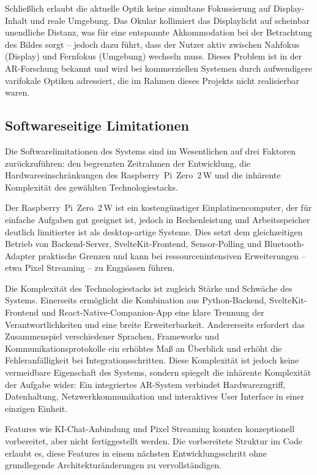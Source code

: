 Schließlich erlaubt die aktuelle Optik keine simultane Fokussierung auf
Display-Inhalt und reale Umgebung.
Das Okular kollimiert das Displaylicht auf scheinbar unendliche Distanz,
was für eine entspannte Akkommodation bei der Betrachtung des Bildes
sorgt -- jedoch dazu führt, dass der Nutzer aktiv zwischen Nahfokus
(Display) und Fernfokus (Umgebung) wechseln muss.
Dieses Problem ist in der AR-Forschung bekannt und wird bei kommerziellen
Systemen durch aufwendigere varifokale Optiken adressiert,
die im Rahmen dieses Projekts nicht realisierbar waren.

\subsection{Softwareseitige Limitationen}
\label{subsec:softwareLimitationen}

Die Softwarelimitationen des Systems sind im Wesentlichen auf drei Faktoren
zurückzuführen: den begrenzten Zeitrahmen der Entwicklung, die
Hardwareeinschränkungen des Raspberry~Pi~Zero~2\,W und die inhärente
Komplexität des gewählten Technologiestacks.

Der Raspberry~Pi~Zero~2\,W ist ein kostengünstiger Einplatinencomputer,
der für einfache Aufgaben gut geeignet ist, jedoch in Rechenleistung
und Arbeitsspeicher deutlich limitierter ist als desktop-artige Systeme.
Dies setzt dem gleichzeitigen Betrieb von Backend-Server, SvelteKit-Frontend,
Sensor-Polling und Bluetooth-Adapter praktische Grenzen und
kann bei ressourcenintensiven Erweiterungen -- etwa Pixel Streaming --
zu Engpässen führen.

Die Komplexität des Technologiestacks ist zugleich Stärke und Schwäche des Systems.
Einerseits ermöglicht die Kombination aus Python-Backend, SvelteKit-Frontend
und React-Native-Companion-App eine klare Trennung der Verantwortlichkeiten
und eine breite Erweiterbarkeit.
Andererseits erfordert das Zusammenspiel verschiedener Sprachen, Frameworks
und Kommunikationsprotokolle ein erhöhtes Maß an Überblick und erhöht
die Fehleranfälligkeit bei Integrationsschritten.
\newpage
Diese Komplexität ist jedoch keine vermeidbare Eigenschaft des Systems,
sondern spiegelt die inhärente Komplexität der Aufgabe wider: Ein integriertes
AR-System verbindet Hardwarezugriff, Datenhaltung, Netzwerkkommunikation
und interaktives User Interface in einer einzigen Einheit.

Features wie KI-Chat-Anbindung und Pixel Streaming konnten konzeptionell
vorbereitet, aber nicht fertiggestellt werden.
Die vorbereitete Struktur im Code erlaubt es, diese Features in einem
nächsten Entwicklungsschritt ohne grundlegende Architekturänderungen
zu vervollständigen.

